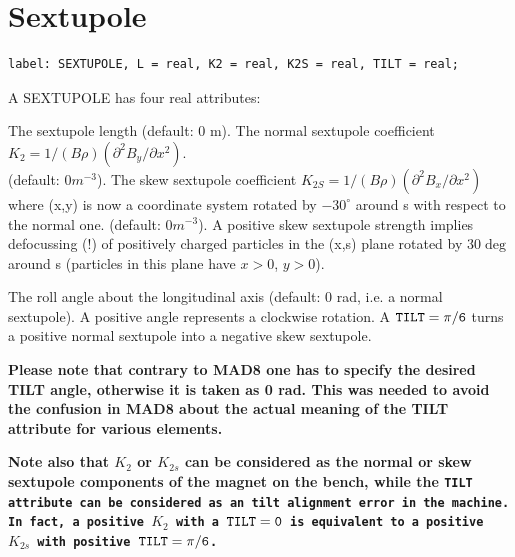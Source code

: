 %
\section{Sextupole}
\label{sec:sextupole}

\begin{verbatim}
label: SEXTUPOLE, L = real, K2 = real, K2S = real, TILT = real;
\end{verbatim} 

A SEXTUPOLE has four real attributes: 
\begin{madlist}
     The sextupole length (default: 0 m). 
     The normal sextupole coefficient $K_2 = 1/(B \rho)
      (\partial^2 B_y / \partial x^2)$. \\       
      (default: $0 m^{-3}$). 
     The skew sextupole coefficient 
      $K_{2S} = 1/(B \rho) (\partial^2 B_x / \partial x^2)$ \\
      where (x,y) is now a coordinate system rotated by $-30^\circ$ around s with
      respect to the normal one. (default: $0 m^{-3}$). A positive skew
      sextupole strength implies defocussing (!) of positively charged
      particles in the (x,s) plane rotated by $30\deg$ around s (particles in
      this plane have $x > 0$, $y > 0$).  

     The roll angle about the longitudinal axis (default: 0
      rad, i.e. a normal sextupole). A positive angle represents a
      clockwise rotation. A $\tt{TILT} = \pi/6$ turns a positive normal sextupole
      into a negative skew sextupole.
      
      \textbf{  Please note that contrary to MAD8 one has to specify the
        desired TILT angle, otherwise it is taken as 0 rad. This was needed to
        avoid the confusion in MAD8 about the actual meaning of the TILT
        attribute for various elements. } 
\end{madlist}

\textbf{Note also that $K_2$ or $K_{2s}$ can be considered as the normal
  or skew sextupole components of the magnet on the bench, while the
  \tt{TILT} attribute can be considered as an tilt alignment error in the
  machine. In fact, a positive $K_2$ with a $\tt{TILT} = 0$ is equivalent to a
  positive $K_{2s}$ with positive $\tt{TILT} = \pi/6$.} 

